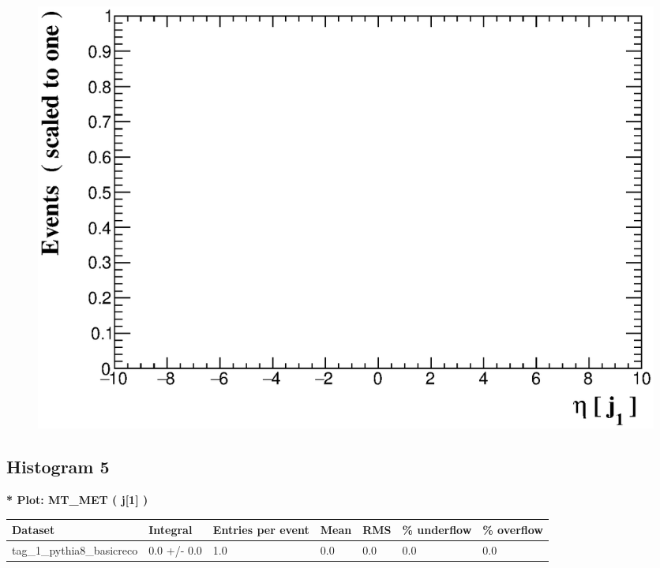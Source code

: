 \documentclass[a4paper, 10pt]{article}
\begin{document}
\begin{figure}[H]
  \begin{center}
    \includegraphics[scale=0.45]{selection_3.eps}\\
\caption{   }
  \end{center}
\end{figure}
      \newpage
\subsection{ Histogram 5}

\textbf{* Plot: MT\_MET ( j[1] ) }\\
   \begin{table}[H]
  \begin{center}
    \begin{tabular}{|m{23.0mm}|m{23.0mm}|m{18.0mm}|m{19.0mm}|m{19.0mm}|m{19.0mm}|m{19.0mm}|}
      \hline
      {\cellcolor{yellow}         Dataset}& {\cellcolor{yellow}         Integral}& {\cellcolor{yellow}         Entries per event}& {\cellcolor{yellow}         Mean}& {\cellcolor{yellow}         RMS}& {\cellcolor{yellow}         \% underflow}& {\cellcolor{yellow}         \% overflow}\\
      \hline
      {\cellcolor{white}         tag\_1\_pythia8\_basicreco}& {\cellcolor{white}         0.0 +/\-- 0.0}& {\cellcolor{white}         1.0}& {\cellcolor{white}         0.0}& {\cellcolor{white}         0.0}& {\cellcolor{green}         0.0}& {\cellcolor{green}         0.0}\\
\hline
    \end{tabular}
  \end{center}
\end{table}
\end{document}
